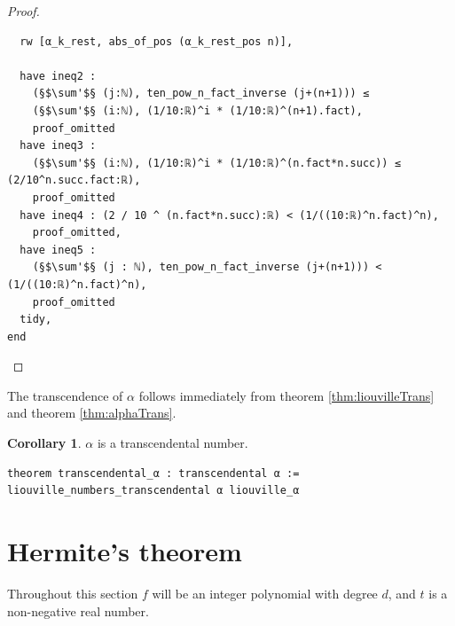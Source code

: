 \documentclass{report}
\theoremstyle{definition}
\newtheorem{corollary}{Corollary}[section]
\begin{document}
\begin{proof}
\begin{verbatim}
  rw [α_k_rest, abs_of_pos (α_k_rest_pos n)],

  have ineq2 : 
    (§$\sum'$§ (j:ℕ), ten_pow_n_fact_inverse (j+(n+1))) ≤ 
    (§$\sum'$§ (i:ℕ), (1/10:ℝ)^i * (1/10:ℝ)^(n+1).fact),
    proof_omitted
  have ineq3 : 
    (§$\sum'$§ (i:ℕ), (1/10:ℝ)^i * (1/10:ℝ)^(n.fact*n.succ)) ≤ (2/10^n.succ.fact:ℝ),
    proof_omitted
  have ineq4 : (2 / 10 ^ (n.fact*n.succ):ℝ) < (1/((10:ℝ)^n.fact)^n),
    proof_omitted,
  have ineq5 : 
    (§$\sum'$§ (j : ℕ), ten_pow_n_fact_inverse (j+(n+1))) < (1/((10:ℝ)^n.fact)^n),
    proof_omitted
  tidy,
end
\end{verbatim}
\end{proof}

The transcendence of $\alpha$ follows immediately from theorem \ref{thm:liouvilleTrans} and theorem \ref{thm:alphaTrans}.
\begin{corollary}
$\alpha$ is a transcendental number.

\begin{verbatim}
theorem transcendental_α : transcendental α := liouville_numbers_transcendental α liouville_α 
\end{verbatim}
\end{corollary}

\section{Hermite's theorem}\label{fmlsn:e}
Throughout this section $f$ will be an integer polynomial with degree $d$, and $t$ is a non-negative real number.
\end{document}
